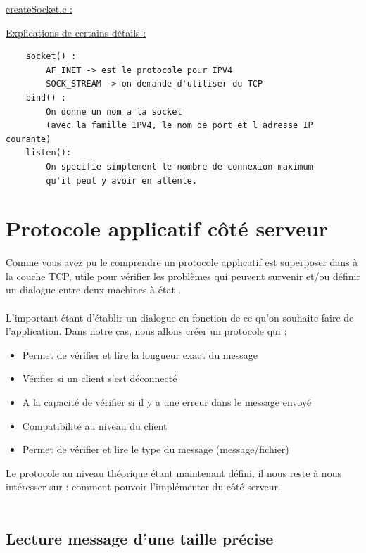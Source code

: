 \underline{createSocket.c :}


\underline{Explications de certains détails :}
\begin{lstlisting}
    socket() :
        AF_INET -> est le protocole pour IPV4
        SOCK_STREAM -> on demande d'utiliser du TCP
    bind() :
        On donne un nom a la socket 
        (avec la famille IPV4, le nom de port et l'adresse IP courante)
    listen():
        On specifie simplement le nombre de connexion maximum 
        qu'il peut y avoir en attente.
\end{lstlisting}

\section{Protocole applicatif côté serveur}

Comme vous avez pu le comprendre un protocole applicatif est superposer dans à la couche TCP, utile pour vérifier les problèmes qui peuvent survenir et/ou définir un dialogue entre deux machines à état . \\ \\

L'important étant d'établir un dialogue en fonction de ce qu'on souhaite faire de l'application. Dans notre cas, nous allons créer un protocole qui :
\begin{itemize}
\item Permet de vérifier et lire la longueur exact du message
\item Vérifier si un client s'est déconnecté
\item A la capacité de vérifier si il y a une erreur dans le message envoyé
\item Compatibilité au niveau du client
\item Permet de vérifier et lire le type du message (message/fichier)
\end{itemize}

Le protocole au niveau théorique étant maintenant défini, il nous reste à nous intéresser sur : comment pouvoir l'implémenter du côté serveur. \\ \\



\subsection{Lecture message d'une taille précise}

